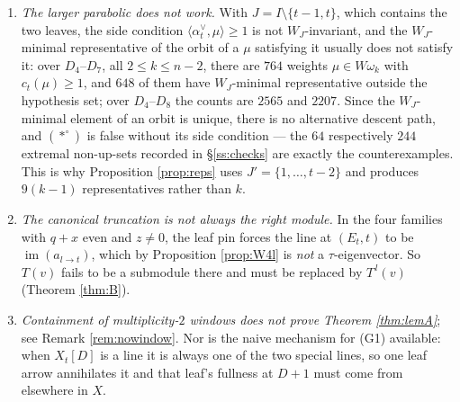 \documentclass[reqno]{amsart}
\theoremstyle{plain}
\theoremstyle{definition}
\DeclareMathOperator{\im}{im}
\newcommand{\al}{\alpha}
\newcommand{\om}{\omega}
\begin{document}
\begin{enumerate}
is not a well-posed statistic.
\item[\textbf{(N5)}] \emph{The larger parabolic does not work.}  With
$J=I\setminus\{t-1,t\}$, which contains the two leaves, the side condition
$\langle\al_t^\vee,\mu\rangle\ge1$ is not $W_J$-invariant, and the
$W_J$-minimal representative of the orbit of a $\mu$ satisfying it usually does
not satisfy it: over $D_4$--$D_7$, all $2\le k\le n-2$, there are $764$ weights
$\mu\in W\om_k$ with $c_t(\mu)\ge1$, and $648$ of them have $W_J$-minimal
representative outside the hypothesis set; over $D_4$--$D_8$ the counts are
$2565$ and $2207$.  Since the
$W_J$-minimal element of an orbit is unique, there is no alternative descent
path, and $(*^\circ)$ is false without its side condition --- the $64$
respectively $244$ extremal non-up-sets recorded in \S\ref{ss:checks} are
exactly the counterexamples.  This is why
Proposition \ref{prop:reps} uses $J'=\{1,\dots,t-2\}$ and produces $9(k-1)$
representatives rather than $k$.
\item[\textbf{(N6)}] \emph{The canonical truncation is not always the right
module.}  In the four families with $q+x$ even and $z\ne0$, the leaf pin forces
the line at $(E_t,t)$ to be $\im(a_{l\to t})$, which by Proposition
\ref{prop:W4l} is \emph{not} a $\tau$-eigenvector.  So $T(v)$ fails to be a
submodule there and must be replaced by $T^{\,l}(v)$ (Theorem \ref{thm:B}).
\item[\textbf{(N7)}] \emph{Containment of multiplicity-$2$ windows does not
prove Theorem \ref{thm:lemA}}; see Remark \ref{rem:nowindow}.  Nor is the naive
mechanism for (G1) available: when $X_t[D]$ is a line it is always one of the
two special lines, so one leaf arrow annihilates it and that leaf's fullness at
$D+1$ must come from elsewhere in $X$.
\end{enumerate}
\end{document}
